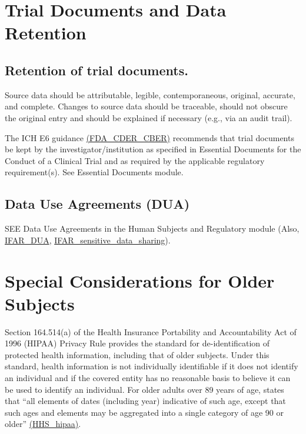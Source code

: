 \documentclass[]{book}
\theoremstyle{definition}
\theoremstyle{definition}
\theoremstyle{definition}
\theoremstyle{remark}
\begin{document}
\section{Trial Documents and Data
Retention}\label{trial-documents-and-data-retention}

\subsection{Retention of trial
documents.}\label{retention-of-trial-documents.}

Source data should be attributable, legible, contemporaneous, original,
accurate, and complete. Changes to source data should be traceable,
should not obscure the original entry and should be explained if
necessary (e.g., via an audit trail).

The ICH E6 guidance
\href{http://www.fda.gov/downloads/Drugs/.../Guidances/ucm073122.pdf}{(FDA\_CDER\_CBER)}
recommends that trial documents be kept by the investigator/institution
as specified in Essential Documents for the Conduct of a Clinical Trial
and as required by the applicable regulatory requirement(s). See
Essential Documents module.

\subsection{Data Use Agreements (DUA)}\label{data-use-agreements-dua-1}

SEE Data Use Agreements in the Human Subjects and Regulatory module
(Also,
\href{http://thehslhub/~/media/HSLNet/P_P/IFAR/IFARPPLimitedDataSetsandDataUseAgreements.ashx}{IFAR\_DUA},
\href{http://thehslhub/~/media/HSLNet/P_P/IFAR/IFARPPSensitiveDataSharing.ashx}{IFAR\_sensitive\_data\_sharing}).

\section{Special Considerations for Older
Subjects}\label{special-considerations-for-older-subjects-13}

Section 164.514(a) of the Health Insurance Portability and
Accountability Act of 1996 (HIPAA) Privacy Rule provides the standard
for de-identification of protected health information, including that of
older subjects. Under this standard, health information is not
individually identifiable if it does not identify an individual and if
the covered entity has no reasonable basis to believe it can be used to
identify an individual. For older adults over 89 years of age, states
that ``all elements of dates (including year) indicative of such age,
except that such ages and elements may be aggregated into a single
category of age 90 or older''
\href{http://www.hhs.gov/hipaa/for-professionals/privacy/special-topics/de-identification/index.html}{(HHS\_hipaa)}.
\end{document}
